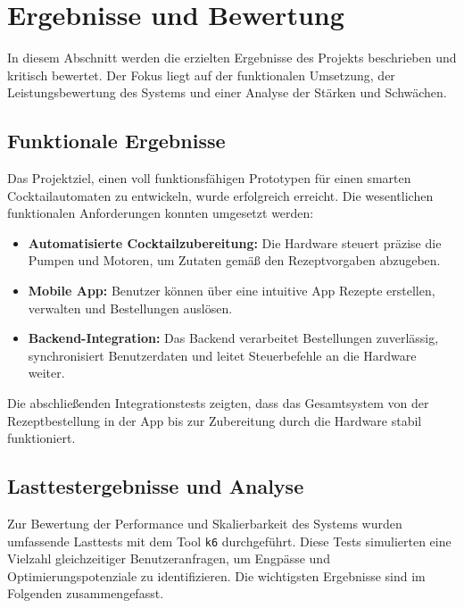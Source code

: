 \section{Ergebnisse und Bewertung}

In diesem Abschnitt werden die erzielten Ergebnisse des Projekts beschrieben und kritisch bewertet. 
Der Fokus liegt auf der funktionalen Umsetzung, der Leistungsbewertung des Systems und einer Analyse 
der Stärken und Schwächen.

\subsection{Funktionale Ergebnisse}

Das Projektziel, einen voll funktionsfähigen Prototypen für einen smarten Cocktailautomaten zu 
entwickeln, wurde erfolgreich erreicht. Die wesentlichen funktionalen Anforderungen konnten 
umgesetzt werden:

\begin{itemize}
  \item \textbf{Automatisierte Cocktailzubereitung:} Die Hardware steuert präzise die \\Pumpen und 
  Motoren, um Zutaten gemäß den Rezeptvorgaben abzugeben.
  \item \textbf{Mobile App:} Benutzer können über eine intuitive App Rezepte erstellen, verwalten 
  und Bestellungen auslösen.
  \item \textbf{Backend-Integration:} Das Backend verarbeitet Bestellungen zuverlässig, 
  \\synchronisiert Benutzerdaten und leitet Steuerbefehle an die Hardware \\weiter.
\end{itemize}

Die abschließenden Integrationstests zeigten, dass das Gesamtsystem von der Rezeptbestellung in der 
App bis zur Zubereitung durch die Hardware stabil \\funktioniert.

\subsection{Lasttestergebnisse und Analyse}

Zur Bewertung der Performance und Skalierbarkeit des Systems wurden umfassende Lasttests mit dem 
Tool \texttt{k6} durchgeführt. Diese Tests simulierten eine Vielzahl gleichzeitiger 
Benutzeranfragen, um Engpässe und Optimierungspotenziale zu identifizieren. Die wichtigsten 
Ergebnisse sind im Folgenden zusammengefasst.

